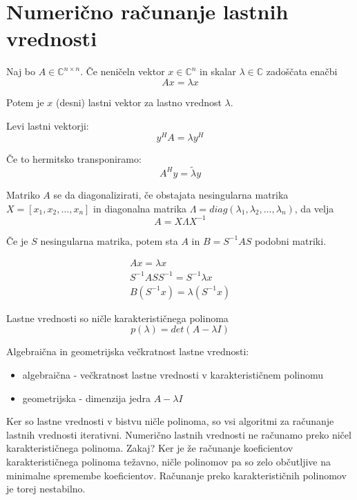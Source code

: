 \documentclass[a4paper,12pt]{article}
\theoremstyle{definition}
\theoremstyle{remark}
\newcommand{\C}{\mathbb{C}}
\begin{document}
\section{Numerično računanje lastnih vrednosti}

Naj bo $A \in \C^{n \times n}$. Če neničeln vektor $x \in \C^n$ in skalar $\lambda \in \C$ zadoščata enačbi
\begin{equation*}
    Ax = \lambda x
\end{equation*}

Potem je $x$ (desni) lastni vektor za lastno vrednost $\lambda$.

Levi lastni vektorji:
\begin{equation*}
    y^H A = \lambda y^H
\end{equation*}

Če to hermitsko transponiramo:
\begin{equation*}
    A^H y = \tilde{\lambda} y
\end{equation*}

Matriko $A$ se da diagonalizirati, če obstajata nesingularna matrika $X = [x_1, x_2, \dots, x_n]$ in diagonalna matrika $\Lambda = diag(\lambda_1, \lambda_2, \dots, \lambda_n)$,
da velja
\begin{equation*}
    A = X \Lambda X^{-1}
\end{equation*}

Če je $S$ nesingularna matrika, potem sta $A$ in $B = S^{-1}AS$ podobni matriki.

\begin{gather*}
    Ax = \lambda x \\
    S^{-1} AS S^{-1} = S^{-1} \lambda x \\
    B(S^{-1} x) = \lambda (S^{-1} x)
\end{gather*}


Lastne vrednosti so ničle karakterističnega polinoma
\begin{equation*}
    p(\lambda) = det(A - \lambda I)
\end{equation*}

Algebraična in geometrijska večkratnost lastne vrednosti:
\begin{itemize}
    \item algebraična - večkratnost lastne vrednosti v karakterističnem polinomu
    \item geometrijska - dimenzija jedra $A - \lambda I$
\end{itemize}

Ker so lastne vrednosti v bistvu ničle polinoma, so vsi algoritmi za računanje lastnih vrednosti iterativni. Numerično lastnih vrednosti ne računamo
preko ničel karakterističnega polinoma. Zakaj? Ker je že računanje koeficientov karakterističnega polinoma težavno, ničle polinomov pa so zelo občutljive
na minimalne spremembe koeficientov. Računanje preko karakterističnih polinomov je torej nestabilno.
\end{document}
